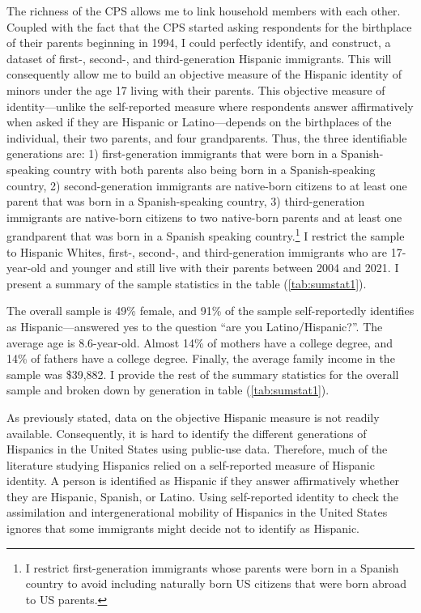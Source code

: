 \documentclass[12pt, fullpage]{article}
\begin{document}
The richness of the CPS allows me to link household members with each other. Coupled with the fact that the CPS started asking respondents for the birthplace of their parents beginning in 1994, I could perfectly identify, and construct, a dataset of first-, second-, and third-generation Hispanic immigrants. This will consequently allow me to build an objective measure of the Hispanic identity of minors under the age 17 living with their parents. This objective measure of identity---unlike the self-reported measure where respondents answer affirmatively when asked if they are Hispanic or Latino---depends on the birthplaces of the individual, their two parents, and four grandparents. Thus, the three identifiable generations are: 1) first-generation immigrants that were born in a Spanish-speaking country with both parents also being born in a Spanish-speaking country, 2) second-generation immigrants are native-born citizens to at least one parent that was born in a Spanish-speaking country, 3) third-generation immigrants are native-born citizens to two native-born parents and at least one grandparent that was born in a Spanish speaking country.\footnote{I restrict first-generation immigrants whose parents were born in a Spanish country to avoid including naturally born US citizens that were born abroad to US parents.} I restrict the sample to Hispanic Whites, first-, second-, and third-generation immigrants who are 17-year-old and younger and still live with their parents between 2004 and 2021. I present a summary of the sample statistics in the table (\ref{tab:sumstat1}). 

The overall sample is 49\% female, and 91\% of the sample self-reportedly identifies as Hispanic---answered yes to the question ``are you Latino/Hispanic?''. The average age is 8.6-year-old. Almost 14\% of mothers have a college degree, and 14\% of fathers have a college degree. Finally, the average family income in the sample was \$39,882. I provide the rest of the summary statistics for the overall sample and broken down by generation in table (\ref{tab:sumstat1}). 

As previously stated, data on the objective Hispanic measure is not readily available. Consequently, it is hard to identify the different generations of Hispanics in the United States using public-use data. Therefore, much of the literature studying Hispanics relied on a self-reported measure of Hispanic identity. A person is identified as Hispanic if they answer affirmatively whether they are Hispanic, Spanish, or Latino. Using self-reported identity to check the assimilation and intergenerational mobility of Hispanics in the United States ignores that some immigrants might decide not to identify as Hispanic. 
\end{document}
